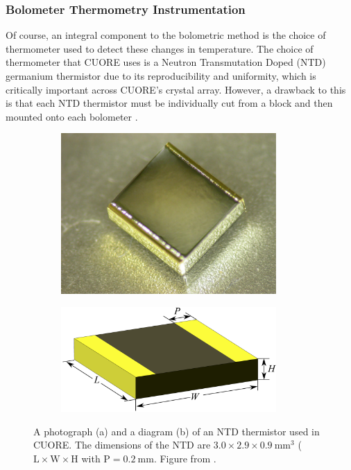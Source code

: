 \subsubsection*{Bolometer Thermometry Instrumentation}
Of course, an integral component to the bolometric method is the choice of thermometer used to detect these changes in temperature.
The choice of thermometer that CUORE uses is a Neutron Transmutation Doped (NTD) germanium thermistor due to its reproducibility and uniformity, which is critically important across CUORE's crystal array. However, a drawback to this is that each NTD thermistor must be individually cut from a block and then mounted onto each bolometer \cite{NTDThermistor}.

\begin{figure}[htbp]
\centering
\begin{subfigure}[t]{0.40\textwidth}
\centering
\includegraphics[width=0.9\textwidth]{Figures/fig04a.pdf}
\caption{}
\label{fig:NTD_picture}
\end{subfigure}
\qquad
\begin{subfigure}[t]{0.40\textwidth}
\centering
\includegraphics[width=0.9\textwidth]{Figures/fig04b.pdf}
\caption{}
\label{fig:NTD_sketch}
\end{subfigure}
\caption[A photograph (a) and a diagram (b) of an NTD thermistor used in CUORE]
{A photograph (a) and a diagram (b) of an NTD thermistor used in CUORE.
The dimensions of the NTD are $3.0\times2.9\times0.9~\textrm{mm}^3$ ($\textrm{L} \times \textrm{W} \times \textrm{H}$ with $\textrm{P}=0.2~\textrm{mm}$.
Figure from \cite{Alduino:2016vjd}.}
\label{fig:NTD}
\end{figure}

